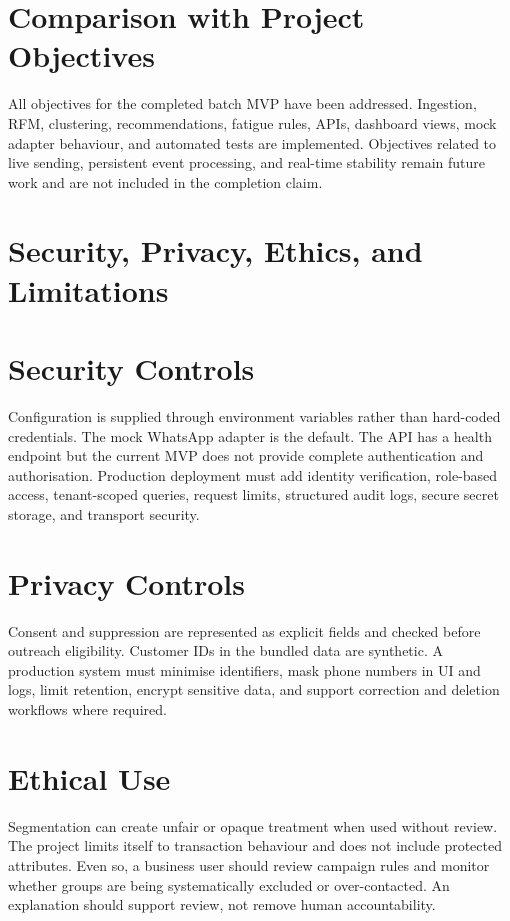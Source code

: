 \documentclass[12pt,a4paper]{report}
\begin{document}
\section{Comparison with Project Objectives}
All objectives for the completed batch MVP have been addressed. Ingestion, RFM, clustering, recommendations, fatigue rules, APIs, dashboard views, mock adapter behaviour, and automated tests are implemented. Objectives related to live sending, persistent event processing, and real-time stability remain future work and are not included in the completion claim.

\section{Security, Privacy, Ethics, and Limitations}
\section{Security Controls}
Configuration is supplied through environment variables rather than hard-coded credentials. The mock WhatsApp adapter is the default. The API has a health endpoint but the current MVP does not provide complete authentication and authorisation. Production deployment must add identity verification, role-based access, tenant-scoped queries, request limits, structured audit logs, secure secret storage, and transport security.

\section{Privacy Controls}
Consent and suppression are represented as explicit fields and checked before outreach eligibility. Customer IDs in the bundled data are synthetic. A production system must minimise identifiers, mask phone numbers in UI and logs, limit retention, encrypt sensitive data, and support correction and deletion workflows where required.

\section{Ethical Use}
Segmentation can create unfair or opaque treatment when used without review. The project limits itself to transaction behaviour and does not include protected attributes. Even so, a business user should review campaign rules and monitor whether groups are being systematically excluded or over-contacted. An explanation should support review, not remove human accountability.
\end{document}
